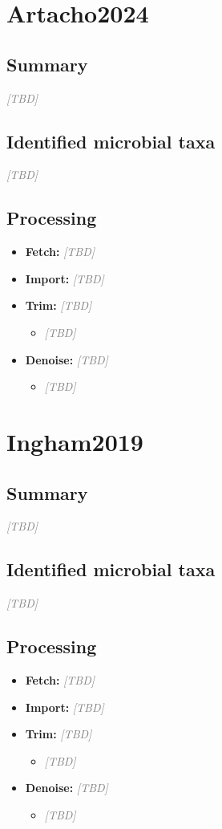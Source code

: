 \documentclass[11pt,a4paper]{article}
\newcommand{\tbd}{\textcolor{gray}{\emph{[TBD]}}}
\begin{document}
\section{Artacho2024}
\subsection{Summary}
\tbd

\subsection{Identified microbial taxa}
\tbd

\subsection{Processing}
\begin{itemize}
\item \textbf{Fetch:} \tbd
\item \textbf{Import:} \tbd
\item \textbf{Trim:} \tbd
  \begin{itemize}
  \item \tbd
  \end{itemize}
\item \textbf{Denoise:} \tbd
  \begin{itemize}
  \item \tbd
  \end{itemize}
\end{itemize}

\section{Ingham2019}
\subsection{Summary}
\tbd

\subsection{Identified microbial taxa}
\tbd

\subsection{Processing}
\begin{itemize}
\item \textbf{Fetch:} \tbd
\item \textbf{Import:} \tbd
\item \textbf{Trim:} \tbd
  \begin{itemize}
  \item \tbd
  \end{itemize}
\item \textbf{Denoise:} \tbd
  \begin{itemize}
  \item \tbd
  \end{itemize}
\end{itemize}
\end{document}
